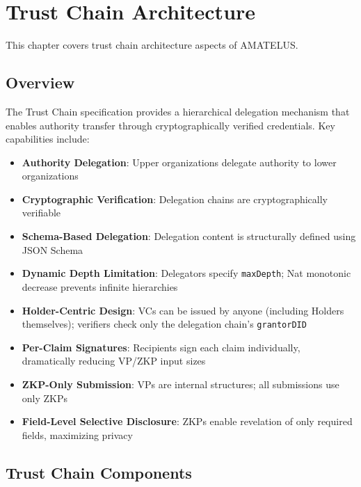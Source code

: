 \chapter{Trust Chain Architecture}


\begin{definition}
  \label{def:chain-chapter}
  This chapter covers trust chain architecture aspects of AMATELUS.
  \leanok
\end{definition}
\section{Overview}

The Trust Chain specification provides a hierarchical delegation mechanism that enables authority transfer through cryptographically verified credentials. Key capabilities include:

\begin{itemize}
  \item \textbf{Authority Delegation}: Upper organizations delegate authority to lower organizations
  \item \textbf{Cryptographic Verification}: Delegation chains are cryptographically verifiable
  \item \textbf{Schema-Based Delegation}: Delegation content is structurally defined using JSON Schema
  \item \textbf{Dynamic Depth Limitation}: Delegators specify \texttt{maxDepth}; Nat monotonic decrease prevents infinite hierarchies
  \item \textbf{Holder-Centric Design}: VCs can be issued by anyone (including Holders themselves); verifiers check only the delegation chain's \texttt{grantorDID}
  \item \textbf{Per-Claim Signatures}: Recipients sign each claim individually, dramatically reducing VP/ZKP input sizes
  \item \textbf{ZKP-Only Submission}: VPs are internal structures; all submissions use only ZKPs
  \item \textbf{Field-Level Selective Disclosure}: ZKPs enable revelation of only required fields, maximizing privacy
\end{itemize}

\section{Trust Chain Components}

